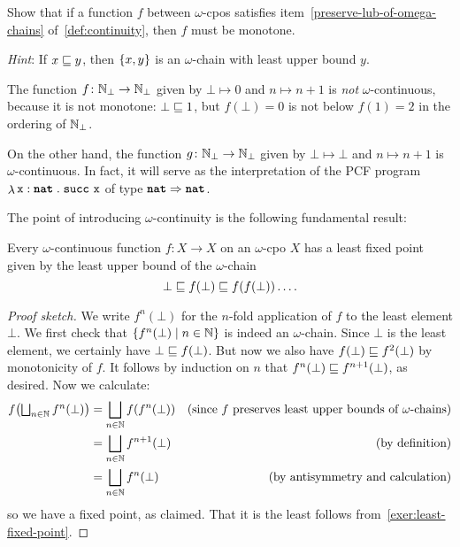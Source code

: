 \begin{exercise}\label{exer:monotonicity-follows}
  Show that if a function \(f\) between \(\omega\)-cpos satisfies
  item~\ref{preserve-lub-of-omega-chains} of~\cref{def:continuity}, then \(f\)
  must be monotone.

  \emph{Hint}: If \(x \sqsubseteq y\), then \(\{x,y\}\) is an \(\omega\)-chain with
  least upper bound \(y\).
\end{exercise}

\begin{example}
  The function \(f \colon \mathbb N_\bot \to \mathbb N_\bot\) given by \(\bot \mapsto 0\)
  and \(n \mapsto n + 1\) is \emph{not} \(\omega\)-continuous, because it is not
  monotone: \(\bot \sqsubseteq 1\), but \(f(\bot) = 0\) is not below \(f(1) = 2\) in
  the ordering of \(\mathbb N_\bot\).

  On the other hand, the function \(g \colon \mathbb N_\bot \to \mathbb N_\bot\) given by
  \(\bot \mapsto \bot\) and \(n \mapsto n+1\) is \(\omega\)-continuous.
  In fact, it will serve as the interpretation of the PCF program
  \(\mathop{\lambda}{\texttt x : \texttt{\textbf{nat}}}\mathrel{.}\operatorname{\texttt{succ}}\,\texttt x\) of type
  \(\texttt{\textbf{nat}} \Rightarrow \texttt{\textbf{nat}}\).
\end{example}

The point of introducing \(\omega\)-continuity is the following fundamental
result:

\begin{theorem}\label{least-fixed-point}
  Every \(\omega\)-continuous function \(f \colon X \to X\) on an \(\omega\)-cpo
  \(X\) has a least fixed point given by the least upper bound of the
  \(\omega\)-chain
  \[
    \bot \sqsubseteq f(\bot) \sqsubseteq f(f(\bot)) \dots.
  \]
\end{theorem}
\begin{proof}[Proof sketch]
  We write \(f^n(\bot)\) for the \(n\)-fold application of \(f\) to the least
  element \(\bot\).
  We first check that \(\{f^n(\bot) \mid n \in \mathbb N\}\) is indeed an
  \(\omega\)-chain.
  Since \(\bot\) is the least element, we certainly have
  \(\bot \sqsubseteq f(\bot)\). But now we also have \(f(\bot) \sqsubseteq f^2(\bot)\) by
  monotonicity of \(f\). It follows by induction on \(n\) that
  \(f^n(\bot) \sqsubseteq f^{n+1}(\bot)\), as desired.
  Now we calculate:
  \begin{align*}
    f\pa*{\textstyle\bigsqcup_{n \in \Nat}f^n(\bot)}
    &= \bigsqcup_{n \in \Nat}f\pa*{f^n(\bot)}
    &\text{(since \(f\) preserves least upper bounds of \(\omega\)-chains)} \\
    &= \bigsqcup_{n \in \Nat}f^{n+1}(\bot)
    &\text{(by definition)} \\
    &= \bigsqcup_{n \in \Nat}f^{n}(\bot)
    &\text{(by antisymmetry and calculation)}
  \end{align*}
  so we have a fixed point, as claimed. That it is the least follows
  from~\cref{exer:least-fixed-point}.
\end{proof}

